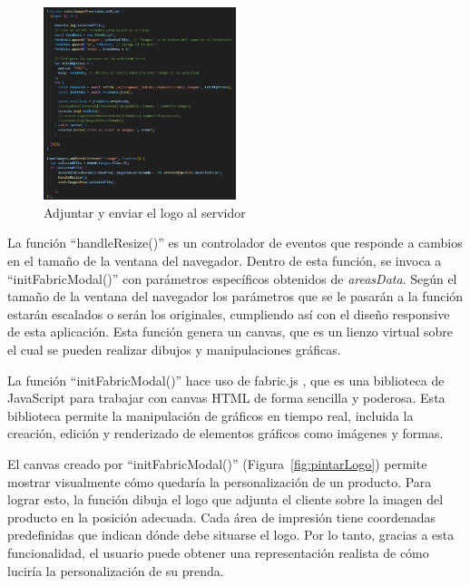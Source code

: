\documentclass[11pt]{article}
\begin{document}
\begin{figure}[H]
    \centering
    \includegraphics[width=0.5\textwidth]{imagenesUS3-modal/AdjuntarLogoFetch.png}
    \caption{\label{fig:adjuntarLogo} Adjuntar y enviar el logo al servidor}
    \vspace{\fill}
\end{figure}


La función ``handleResize()'' es un controlador de eventos que responde a cambios en el tamaño de la ventana del navegador. 
Dentro de esta función, se invoca a ``initFabricModal()'' con parámetros específicos obtenidos de \textit{areasData}. Según el tamaño de la ventana del navegador
los parámetros que se le pasarán a la función estarán escalados o serán los originales, cumpliendo así con el diseño responsive de esta aplicación. 
Esta función genera un canvas, que es un lienzo virtual sobre el cual se pueden realizar dibujos y manipulaciones gráficas.

La función ``initFabricModal()'' hace uso de fabric.js \cite{fabric.js}, que es una biblioteca de JavaScript 
para trabajar con canvas HTML de forma sencilla y poderosa. Esta biblioteca permite la manipulación de gráficos 
en tiempo real, incluida la creación, edición y renderizado de elementos gráficos como imágenes y formas.

El canvas creado por ``initFabricModal()'' (Figura~\ref{fig:pintarLogo}) permite mostrar visualmente cómo quedaría la personalización de un producto. Para lograr esto, la 
función dibuja el logo que adjunta el cliente sobre la imagen del producto en la posición adecuada. Cada área de impresión tiene coordenadas 
predefinidas que indican dónde debe situarse el logo. Por lo tanto, gracias a esta funcionalidad, el usuario puede obtener una representación 
realista de cómo luciría la personalización de su prenda.
\end{document}
